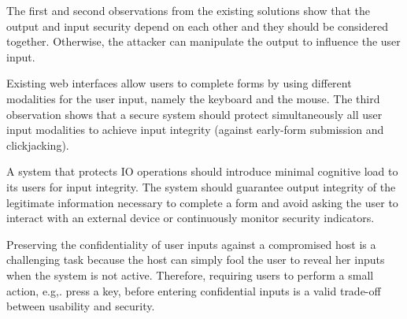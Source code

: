The first and second observations from the existing solutions show that the output and input security depend on each other and they should be considered together. Otherwise, the attacker can manipulate the output to influence the user input.

Existing web interfaces allow users to complete forms by using different modalities for the user input, namely the keyboard and the mouse.
The third observation shows that a secure system should protect simultaneously all user input modalities to achieve input integrity (against early-form submission and clickjacking).


A system that protects IO operations should introduce minimal cognitive load to its users for input integrity.
The system should guarantee output integrity of the legitimate information necessary to complete a form and avoid asking the user to interact with an external device or continuously monitor security indicators.


Preserving the confidentiality of user inputs against a compromised host is a challenging task because the host can simply fool the user to reveal her inputs when the system is not active. Therefore, requiring users to perform a small action, e.g,. press a key, before entering confidential inputs is a valid trade-off between usability and security.

